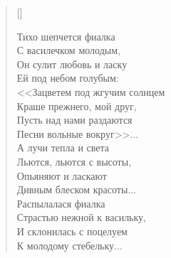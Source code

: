 \newpage
\vspace*{0cm}


\settowidth{\versewidth}{<<Зацветем под жгучим солнцем}
\begin{verse}[\versewidth]
\begin{altverse}
Тихо шепчется фиалка\\
    С василечком молодым,\\
Он сулит любовь и ласку\\
    Ей под небом голубым:\\
<<Зацветем под жгучим солнцем\\
    Краше прежнего, мой друг,\\
Пусть над нами раздаются\\
    Песни вольные вокруг>>...\\
А лучи тепла и света\\
    Льются, льются с высоты,\\
Опьяняют и ласкают\\
    Дивным блеском красоты...\\
Распылалася фиалка\\
    Страстью нежной к васильку,\\
И склонилась с поцелуем\\
    К молодому стебельку...\\
\end{altverse}
\end{verse}


\newpage
\vspace*{-2.5cm}


